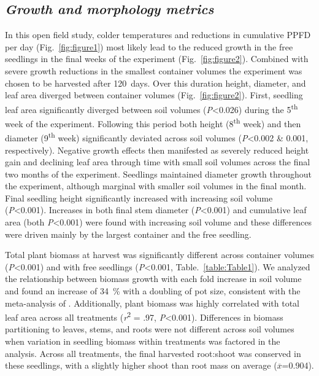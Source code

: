 \documentclass[a4paper]{article}\usepackage[]{graphicx}\usepackage[]{color}
\begin{document}
\subsection*{\textit{Growth and morphology metrics}}
In this open field study, colder temperatures and reductions in cumulative PPFD per day (Fig.~\ref{fig:figure1}) most likely lead to the reduced growth in the free seedlings in the final weeks of the experiment (Fig.~\ref{fig:figure2}).  Combined with severe growth reductions in the smallest container volumes the experiment was chosen to be harvested after 120~days. Over this duration height, diameter, and leaf area diverged between container volumes (Fig.~\ref{fig:figure2}).  First, seedling leaf area significantly diverged between soil volumes (\textit{P}\textless0.026) during the 5\textsuperscript{th} week of the experiment. Following this period both height (8\textsuperscript{th} week) and then diameter (9\textsuperscript{th} week) significantly deviated across soil volumes (\textit{P}\textless0.002 \& 0.001, respectively).  Negative growth effects then manifested as severely reduced height gain and declining leaf area through time with small soil volumes across the final two months of the experiment. Seedlings maintained diameter growth throughout the experiment, although marginal with smaller soil volumes in the final month. Final seedling height significantly increased with increasing soil volume (\textit{P}\textless0.001).  Increases in both final stem diameter (\textit{P}\textless0.001) and cumulative leaf area (both \textit{P}\textless0.001) were found with increasing soil volume and these differences were driven mainly by the largest container and the free seedling.

Total plant biomass at harvest was significantly different across container volumes (\textit{P}\textless0.001) and with free seedlings (\textit{P}\textless0.001, Table.~\ref{table:Table1}). We analyzed the relationship between biomass growth with each fold increase in soil volume and found an increase of 34~\% with a doubling of pot size, consistent with the meta-analysis of \citet{poorter2012pot}. Additionally, plant biomass was highly correlated with total leaf area across all treatments (\textit{r}\textsuperscript{2} = .97, \textit{P}\textless0.001). Differences in biomass partitioning to leaves, stems, and roots were not different across soil volumes when variation in seedling biomass within treatments was factored in the analysis. Across all treatments, the final harvested root:shoot was conserved in these seedlings, with a slightly higher shoot than root mass on average ($\overline{x}$=0.904).
\end{document}
